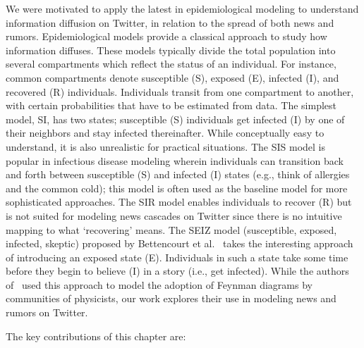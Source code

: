 We were motivated to apply the latest in epidemiological modeling to understand
information diffusion on Twitter, in relation to the spread
of both news and rumors.
Epidemiological models provide
a classical approach to study how information diffuses.
These models typically divide the total population into several compartments
which reflect the status of an individual. For instance, common compartments
denote susceptible (S), exposed (E), infected (I), and
recovered (R) individuals. Individuals transit from one compartment to another, with
certain probabilities that have to be estimated from data.
The simplest model, SI, has two states; susceptible (S) individuals get infected (I) by one of their neighbors
and stay infected thereinafter. While conceptually easy to understand,
it is also unrealistic
for practical situations. The SIS model is
popular in infectious disease modeling wherein individuals can transition back
and forth between
susceptible (S) and infected (I) states (e.g., think of allergies and
the common cold); this model is often used as the
baseline model for more sophisticated approaches. The SIR model
enables individuals to
recover (R) but is not suited for modeling news cascades on Twitter since there
is no intuitive mapping to what `recovering' means.
The SEIZ
model (susceptible, exposed, infected, skeptic) proposed by Bettencourt et al.~\cite{powerofgoodidea:2006}
takes the interesting approach of introducing an exposed state (E).
Individuals in such a state take some time before they begin to believe (I)
in a story (i.e., get infected). While the authors
of~\cite{powerofgoodidea:2006}
used this approach to model the adoption of Feynman
diagrams by communities of physicists, our work explores their use in
modeling news and rumors on Twitter.


The key contributions of this chapter are:

